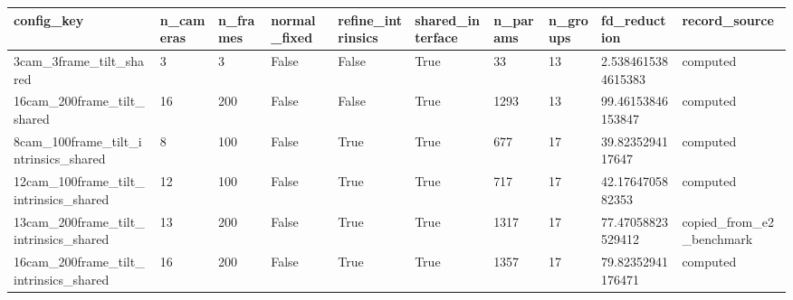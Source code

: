 \begin{tabular}{|l|l|l|l|l|l|l|l|l|l|}
\hline
config\_key & n\_cameras & n\_frames & normal\_fixed & refine\_intrinsics & shared\_interface & n\_params & n\_groups & fd\_reduction & record\_source \\
\hline
3cam\_3frame\_tilt\_shared & 3 & 3 & False & False & True & 33 & 13 & 2.5384615384615383 & computed \\
16cam\_200frame\_tilt\_shared & 16 & 200 & False & False & True & 1293 & 13 & 99.46153846153847 & computed \\
8cam\_100frame\_tilt\_intrinsics\_shared & 8 & 100 & False & True & True & 677 & 17 & 39.8235294117647 & computed \\
12cam\_100frame\_tilt\_intrinsics\_shared & 12 & 100 & False & True & True & 717 & 17 & 42.1764705882353 & computed \\
13cam\_200frame\_tilt\_intrinsics\_shared & 13 & 200 & False & True & True & 1317 & 17 & 77.47058823529412 & copied\_from\_e2\_benchmark \\
16cam\_200frame\_tilt\_intrinsics\_shared & 16 & 200 & False & True & True & 1357 & 17 & 79.82352941176471 & computed \\
\hline
\end{tabular}
